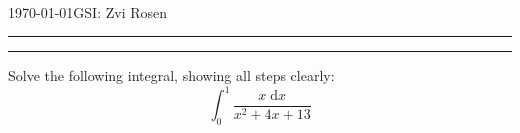 \documentclass[12pt]{article}
\begin{document}
\\

\today      \hfill GSI: Zvi Rosen
\bigskip
\hrule
\bigskip

\bigskip

\hrule
\bigskip

Solve the following integral, showing all steps clearly:
\[ \int_0^1 \dfrac{x \; \mathrm{d}x}{x^2+4x+13} \]
\end{document}
